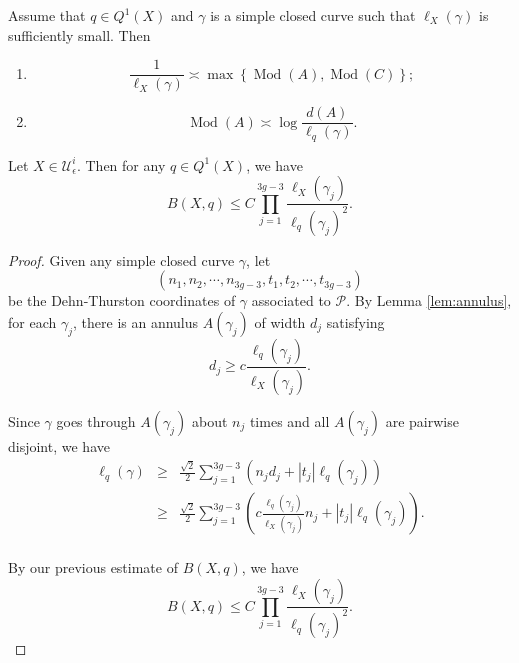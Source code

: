 \documentclass[10pt,a4paper]{amsart}
\begin{document}
\begin{lemma}\label{lem:annulus}
  Assume that $q\in Q^1(X)$ and $\gamma$ is a simple closed curve such that $\ell_X(\gamma)$ is sufficiently small. Then  
  \begin{enumerate}
      \item[(1)]  $$\frac{1}{\ell_X(\gamma)} \asymp \max\left\{ \operatorname{Mod}(A), \operatorname{Mod}(C)\right\};$$
      \item[(2)] $$\operatorname{Mod}(A) \asymp \log \frac{d(A)}{\ell_q(\gamma)}.$$
  \end{enumerate}
\end{lemma}

\begin{theorem}\label{thm:upper}
    Let $X\in \mathcal{U}_\epsilon^i$. Then for any $q\in Q^1(X)$, we have 
    $$B(X,q)\leq C \prod_{j=1}^{3g-3} \frac{\ell_X(\gamma_j)}{\ell_q(\gamma_j)^2}. $$
\end{theorem}

\begin{proof}
    

    Given any simple closed curve $\gamma$, let 
    $$\left(n_1, n_2, \cdots, n_{3g-3},t_1, t_2, \cdots, t_{3g-3}\right)$$
    be the Dehn-Thurston coordinates of $\gamma$ associated to $\mathcal{P}$. By Lemma \ref{lem:annulus}, for each $\gamma_j$, there is an annulus $A(\gamma_j)$ of width $d_j$ satisfying 
    $$d_j \geq c \frac{\ell_q(\gamma_j)}{\ell_X(\gamma_j)}.$$

    
    Since $\gamma$ goes through $A(\gamma_j)$ about $n_j$ times and all $A(\gamma_j)$ are pairwise disjoint, we have
\begin{eqnarray*}
\ell_q(\gamma) &\geq &  \frac{\sqrt{2}}{2}\sum \limits_{j=1}^{3g-3} \left( n_jd_j+|t_j| \ell_q(\gamma_j) \right) \\
&\geq&   \frac{\sqrt{2}}{2} \sum \limits_{j=1}^{3g-3} \left( c \frac{\ell_q(\gamma_j)}{\ell_X(\gamma_j)}n_j +|t_j| \ell_q(\gamma_j) \right). \\
\end{eqnarray*}

    By our previous estimate of $B(X,q)$, we have
    $$B(X,q)\leq C \prod_{j=1}^{3g-3} \frac{\ell_X(\gamma_j)}{\ell_q(\gamma_j)^2}. $$   

\end{proof}
\end{document}
